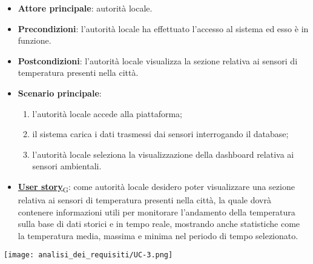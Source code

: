 \begin{itemize}
	\item \textbf{Attore principale}: autorità locale.
	\item \textbf{Precondizioni}: l'autorità locale ha effettuato l'accesso al sistema ed esso è in funzione.
	\item \textbf{Postcondizioni}: l'autorità locale visualizza la sezione relativa
	      ai sensori di temperatura presenti nella città.
	\item \textbf{Scenario principale}:
	      \begin{enumerate}
		      \item l'autorità locale accede alla piattaforma;
		      \item il sistema carica i dati trasmessi dai sensori interrogando il database;
		      \item l'autorità locale seleziona la visualizzazione della dashboard relativa ai sensori ambientali.
	      \end{enumerate}
	\item \href{https://7last.github.io/docs/pb/documentazione-interna/glossario\#user-story}{\textbf{User story}\textsubscript{G}}:
	      come autorità locale desidero poter visualizzare una sezione relativa ai sensori di temperatura presenti nella città, la quale
	      dovrà contenere informazioni utili per monitorare l'andamento della temperatura sulla base di dati storici e in tempo reale, mostrando
	      anche statistiche come la temperatura media, massima e minima nel periodo di tempo selezionato.
\end{itemize}
\begin{center}
	\texttt{[image: analisi\_dei\_requisiti/UC-3.png]}
\end{center}


